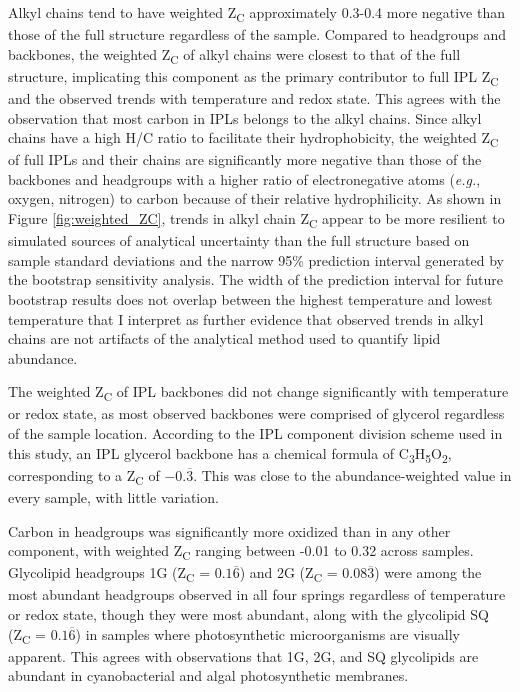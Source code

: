 Alkyl chains tend to have weighted Z\textsubscript{C} approximately 0.3-0.4 more negative than those of the full structure regardless of the sample. Compared to headgroups and backbones, the weighted Z\textsubscript{C} of alkyl chains were closest to that of the full structure, implicating this component as the primary contributor to full IPL Z\textsubscript{C} and the observed trends with temperature and redox state. This agrees with the observation that most carbon in IPLs belongs to the alkyl chains. Since alkyl chains have a high H/C ratio to facilitate their hydrophobicity, the weighted Z\textsubscript{C} of full IPLs and their chains are significantly more negative than those of the backbones and headgroups with a higher ratio of electronegative atoms (\textit{e.g.}, oxygen, nitrogen) to carbon because of their relative hydrophilicity. As shown in Figure \ref{fig:weighted_ZC}, trends in alkyl chain Z\textsubscript{C} appear to be more resilient to simulated sources of analytical uncertainty than the full structure based on sample standard deviations and the narrow 95\% prediction interval generated by the bootstrap sensitivity analysis. The width of the prediction interval for future bootstrap results does not overlap between the highest temperature and lowest temperature that I interpret as further evidence that observed trends in alkyl chains are not artifacts of the analytical method used to quantify lipid abundance.

The weighted Z\textsubscript{C} of IPL backbones did not change significantly with temperature or redox state, as most observed backbones were comprised of glycerol regardless of the sample location. According to the IPL component division scheme used in this study, an IPL glycerol backbone has a chemical formula of C\textsubscript{3}H\textsubscript{5}O\textsubscript{2}, corresponding to a Z\textsubscript{C} of $-0.\overline{3}$. This was close to the abundance-weighted value in every sample, with little variation.

Carbon in headgroups was significantly more oxidized than in any other component, with weighted Z\textsubscript{C} ranging between -0.01 to 0.32 across samples. Glycolipid headgroups 1G (Z\textsubscript{C} = $0.1\overline{6}$) and 2G (Z\textsubscript{C} = $0.08\overline{3}$) were among the most abundant headgroups observed in all four springs regardless of temperature or redox state, though they were most abundant, along with the glycolipid SQ (Z\textsubscript{C} = $0.1\overline{6}$) in samples where photosynthetic microorganisms are visually apparent. This agrees with observations that 1G, 2G, and SQ glycolipids are abundant in cyanobacterial \citep{wada2009lipids} and algal \citep{guschina2006lipids} photosynthetic membranes.

